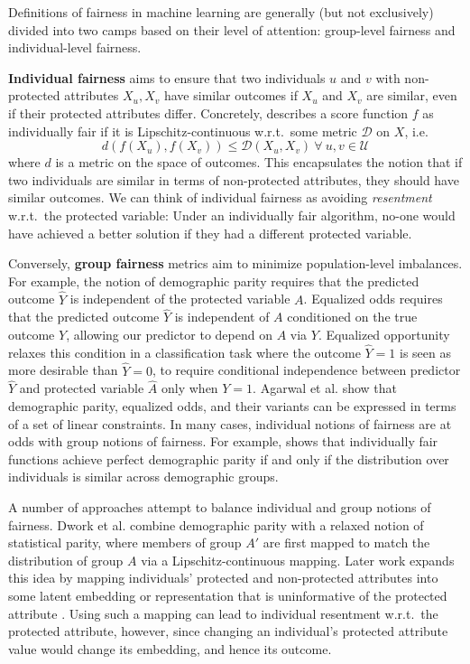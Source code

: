     Definitions of fairness in machine learning are generally (but not exclusively) divided into two camps based on their level of attention: group-level fairness and individual-level fairness.
    
    \textbf{Individual fairness} aims to ensure that two individuals $u$ and $v$ with non-protected attributes $X_u, X_v$ have similar outcomes if $X_u$ and $X_v$ are similar, even if their protected attributes differ. Concretely, \citep{dwork2012fairness} describes a score function $f$ as individually fair if it is Lipschitz-continuous w.r.t.\ some metric $\mathcal{D}$ on $X$, i.e.\
    \begin{equation}d(f(X_u), f(X_v)) \le \mathcal{D}(X_u, X_v) ~\forall~ u, v \in \mathcal{U}\label{eqn:IndFair}\end{equation}
    where $d$ is a metric on the space of outcomes. This encapsulates the notion that if two individuals are similar in terms of non-protected attributes, they should have similar outcomes. We can think of individual fairness as avoiding \textit{resentment} w.r.t.\ the protected variable: Under an individually fair algorithm, no-one would have achieved a better solution if they had a different protected variable. 
    
    
    Conversely, \textbf{group fairness} metrics aim to minimize population-level imbalances. For example, the notion of demographic parity \citep{dwork2012fairness} requires that the predicted outcome $\hat{Y}$ is independent of the protected variable $A$. Equalized odds \citep{HarPriSre2016} requires that the predicted outcome $\hat{Y}$ is independent of $A$ conditioned on the true outcome $Y$, allowing our predictor to depend on $A$ via $Y$. Equalized opportunity \citep{HarPriSre2016} relaxes this condition in a classification task where the outcome $\hat{Y}=1$ is seen as more desirable than $\hat{Y}=0$, to require conditional independence between predictor $\hat{Y}$ and protected variable $\hat{A}$ only when $Y=1$. Agarwal et al. \cite{AgaBeyDudLanWal2018} show that demographic parity, equalized odds, and their variants can be expressed in terms of a set of linear constraints.  In many cases, individual notions of fairness are at odds with group notions of fairness. For example, \cite{dwork2012fairness} shows that individually fair functions achieve perfect demographic parity if and only if the distribution over individuals is similar across demographic groups.
    
    A number of approaches attempt to balance individual and group notions of fairness. Dwork et al. \cite{dwork2012fairness} combine demographic parity with a relaxed notion of statistical parity, where members of group $A'$ are first mapped to match the distribution of group $A$ via a Lipschitz-continuous mapping. Later work expands this idea by mapping individuals' protected and non-protected attributes into some latent embedding or representation that is uninformative of the protected attribute \citep{ZemQiSwePitDwo2013,MadCrePitZem2018}. Using such a mapping can lead to individual resentment w.r.t.\ the protected attribute, however,  since changing an individual's protected attribute value would change its embedding, and hence its outcome.
    
